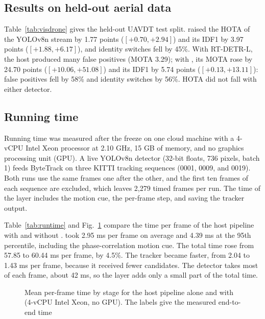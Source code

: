 

\subsection{Results on held-out aerial data}\label{sec:visdrone}
Table~\ref{tab:visdrone} gives the held-out UAVDT test split. \scl{} raised the HOTA of the YOLOv8n stream by 1.77 points
($[+0.70,+2.94]$) and its IDF1 by 3.97 points ($[+1.88,+6.17]$), and
identity switches fell by 45\%. With RT-DETR-L, the host produced many false
positives (MOTA 3.29); with \scl{}, its MOTA rose by 24.70 points
($[+10.06,+51.08]$) and its IDF1 by 5.74 points ($[+0.13,+13.11]$): false
positives fell by 58\% and identity switches by 56\%. HOTA did not fall with either
detector.



\subsection{Running time}\label{sec:latency}
\label{sec:latency-setup}Running time was measured after the freeze on one cloud machine with a 4-vCPU
Intel Xeon processor at 2.10 GHz, 15 GB of memory, and no graphics processing unit (GPU). A live YOLOv8n
detector (32-bit floats, 736 pixels, batch 1) feeds ByteTrack on three KITTI
tracking sequences (0001, 0009, and 0019). Both runs use the same frames
one after the other, and the first ten frames of each sequence are excluded,
which leaves 2,279 timed frames per run. The time of the layer includes the
motion cue, the per-frame step, and saving the tracker output.

Table~\ref{tab:runtime} and Fig.~\ref{fig:runtime} compare the time per frame
of the host pipeline with and without \scl{}. \scl{} took 2.95 ms per
frame on average and 4.39 ms at the 95th percentile, including the
phase-correlation motion cue. The total time rose from 57.85 to 60.44 ms
per frame, by 4.5\%. The tracker became faster, from 2.04 to 1.43 ms per
frame, because it received fewer candidates. The detector takes most of each
frame, about 42 ms, so the layer adds only a small part of the total time.



\begin{figure}[t]
\centering

\caption{Mean per-frame time by stage for the host pipeline alone and with
\scl{} (4-vCPU Intel Xeon, no GPU). The labels give the measured
end-to-end time}
\label{fig:runtime}
\end{figure}
